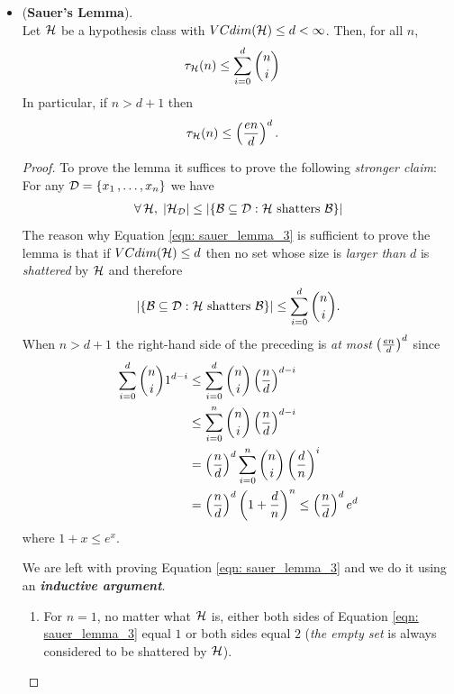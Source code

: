 \documentclass[11pt]{article}
\begin{document}
\begin{itemize}
\item \begin{lemma} (\textbf{Sauer's Lemma}). \citep{shalev2014understanding, mohri2018foundations}\\
Let ${\mathcal H}$ be a hypothesis class with $VCdim({\mathcal H}) \le d < \infty$. Then, for all $n$, 
\begin{align}
\tau_{{\mathcal H}}(n) &\le \sum_{i=0}^{d}{{n}\choose{i}} \label{eqn: sauer_lemma_1}
\end{align}
In particular, if $n > d + 1$ then
\begin{align}
\tau_{{\mathcal H}}(n) &\le \left(\frac{en}{d}\right)^{d}. \label{eqn: sauer_lemma_2}
\end{align}
\end{lemma}
\begin{proof}
To prove the lemma it suffices to prove the following \emph{stronger claim}: For any ${\mathcal D} = \left\{x_1 \,{,}\ldots{,}\, x_n\right\}$ we have
\begin{align}
\forall\, {\mathcal H}, \; \left\lvert {\mathcal H}_{{\mathcal D}} \right\rvert \le  \left\lvert \left\{{\mathcal B} \subseteq {\mathcal D}: {\mathcal H}\text{ shatters }{\mathcal B}\right\} \right\rvert\label{eqn: sauer_lemma_3}
\end{align} The reason why Equation \eqref{eqn: sauer_lemma_3} is sufficient to prove the lemma is that if
$VCdim({\mathcal H}) \le d$ then no set whose size is \emph{larger than} $d$ is \emph{shattered} by ${\mathcal H}$ and therefore
\begin{align*}
\left\lvert \left\{{\mathcal B} \subseteq {\mathcal D}: {\mathcal H}\text{ shatters }{\mathcal B}\right\} \right\rvert \le  \sum_{i=0}^{d}{{n}\choose{i}}.
\end{align*}
When $n > d + 1$ the right-hand side of the preceding is \emph{at most} $\left(\frac{en}{d}\right)^{d}$ since
\begin{align*}
 \sum_{i=0}^{d}{{n}\choose{i}}1^{d- i} &\le  \sum_{i=0}^{d}{{n}\choose{i}}\left(\frac{n}{d}\right)^{d - i}\\
 &\le  \sum_{i=0}^{n}{{n}\choose{i}}\left(\frac{n}{d}\right)^{d - i} \\
 &= \left(\frac{n}{d}\right)^{d} \sum_{i=0}^{n}{{n}\choose{i}}\left(\frac{d}{n}\right)^{i} \\
 &= \left(\frac{n}{d}\right)^{d}\left(1 + \frac{d}{n}\right)^n \le \left(\frac{n}{d}\right)^{d}e^{d}
\end{align*} where $1+x \le e^x$.



We are left with proving Equation \eqref{eqn: sauer_lemma_3} and we do it using an \emph{\textbf{inductive argument}}. 
\begin{enumerate}
\item For $n = 1$, no matter what ${\mathcal H}$ is, either both sides of Equation \eqref{eqn: sauer_lemma_3} equal $1$ or both sides equal $2$ (\emph{the empty set} is always considered to be shattered by ${\mathcal H}$).






\end{enumerate}
\end{proof}
\end{itemize}
\end{document}
